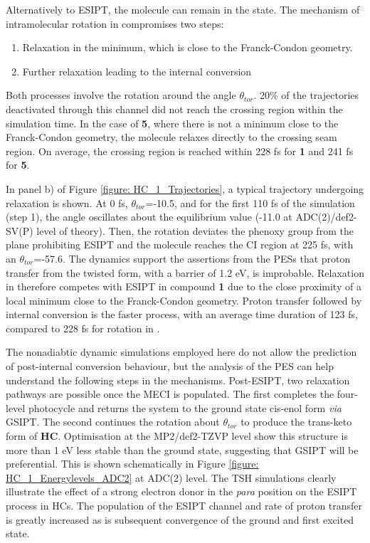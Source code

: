 Alternatively to ESIPT, the molecule can remain in the \Estar{} state. The mechanism of intramolecular rotation in \Estar{} compromises two steps: 
\begin{enumerate}
    \item Relaxation in the \Estar{} minimum, which is close to the Franck-Condon geometry.
    \item Further relaxation leading to the internal conversion
\end{enumerate}
Both processes involve the rotation around the angle $\theta_{tor}$. 20\% of the trajectories deactivated through this channel did not reach the crossing region within the simulation time. In the case of \textbf{5}, where there is not a \Estar{} minimum close to the Franck-Condon geometry, the molecule relaxes directly to the crossing seam region. On average, the crossing region is reached within  228 fs for \textbf{1} and 241 fs for \textbf{5}. 

In panel b) of Figure \ref{figure: HC_1_Trajectories}, a typical trajectory undergoing \Estar{} relaxation is shown. At 0 fs,  $\theta_{tor}$=-10.5\textdegree{}, and for the first 110 fs of the simulation (step 1), the angle oscillates about the equilibrium value (-11.0\textdegree{} at ADC(2)/def2-SV(P) level of theory). Then, the rotation deviates the phenoxy group from the plane prohibiting ESIPT and the molecule reaches the CI region at 225 fs, with an $\theta_{tor}$=-57.6\textdegree{}. The dynamics support the assertions from the \acp{PES} that proton transfer from the twisted \Estar{} form, with a barrier of 1.2 eV, is improbable. Relaxation in \Estar{} therefore competes with ESIPT in compound \textbf{1} due to the close proximity of a local minimum close to the Franck-Condon geometry. Proton transfer followed by internal conversion is the faster process, with an average time duration of 123 fs, compared to 228 fs for rotation in \Estar{}.

The nonadiabtic dynamic simulations employed here do not allow the prediction of post-internal conversion behaviour, but the analysis of the PES can help understand the following steps in the mechanisms. Post-ESIPT, two relaxation pathways are possible once the MECI is populated. The first completes the four-level photocycle and returns the system to the ground state cis-enol form \textit{via} \ac{GSIPT}. The second continues the rotation about $\theta_{tor}$ to produce the trans-keto form of \textbf{HC}.  Optimisation at the MP2/def2-TZVP level show this structure is more than 1 eV less stable than the ground state, suggesting that \ac{GSIPT} will be preferential. This is shown schematically in Figure \ref{figure: HC_1_Energylevels_ADC2} at ADC(2) level. The \ac{TSH} simulations clearly illustrate the effect of a strong electron donor in the \textit{para} position on the ESIPT process in \ac{HC}s. The population of the ESIPT channel and rate of proton transfer is greatly increased as is subsequent convergence of the ground and first excited state. 

